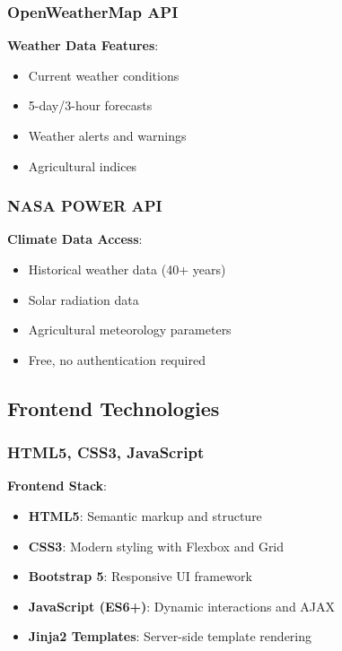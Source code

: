 \documentclass[12pt,a4paper]{article}
\begin{document}
\subsubsection{OpenWeatherMap API}

\textbf{Weather Data Features}:
\begin{itemize}[leftmargin=*]
    \item Current weather conditions
    \item 5-day/3-hour forecasts
    \item Weather alerts and warnings
    \item Agricultural indices
\end{itemize}

\subsubsection{NASA POWER API}

\textbf{Climate Data Access}:
\begin{itemize}[leftmargin=*]
    \item Historical weather data (40+ years)
    \item Solar radiation data
    \item Agricultural meteorology parameters
    \item Free, no authentication required
\end{itemize}

\subsection{Frontend Technologies}

\subsubsection{HTML5, CSS3, JavaScript}

\textbf{Frontend Stack}:
\begin{itemize}[leftmargin=*]
    \item \textbf{HTML5}: Semantic markup and structure
    \item \textbf{CSS3}: Modern styling with Flexbox and Grid
    \item \textbf{Bootstrap 5}: Responsive UI framework
    \item \textbf{JavaScript (ES6+)}: Dynamic interactions and AJAX
    \item \textbf{Jinja2 Templates}: Server-side template rendering
\end{itemize}
\end{document}
